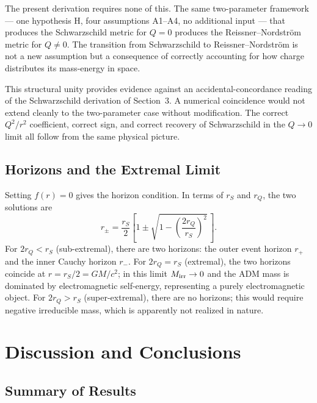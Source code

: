 \documentclass[12pt]{article}
\begin{document}
The present derivation requires none of this.
The same two-parameter framework --- one hypothesis H, four assumptions
A1--A4, no additional input --- that produces the Schwarzschild metric
for $Q = 0$ produces the Reissner--Nordstr\"om metric for $Q \neq 0$.
The transition from Schwarzschild to Reissner--Nordstr\"om is not a
new assumption but a consequence of correctly accounting for how charge
distributes its mass-energy in space.

This structural unity provides evidence against an accidental-concordance
reading of the Schwarzschild derivation of Section~3.
A numerical coincidence would not extend cleanly to the two-parameter
case without modification.
The correct $Q^2/r^2$ coefficient, correct sign, and correct recovery
of Schwarzschild in the $Q \to 0$ limit all follow from the same
physical picture.

\subsection{Horizons and the Extremal Limit}
\label{sec:rn-horizons}

Setting $f(r) = 0$ gives the horizon condition.
In terms of $r_S$ and $r_Q$, the two solutions are
\begin{equation}
  r_\pm = \frac{r_S}{2}\!\left[1 \pm
          \sqrt{1 - \left(\frac{2r_Q}{r_S}\right)^{\!2}}\,\right].
  \label{eq:rn-horizons}
\end{equation}
For $2r_Q < r_S$ (sub-extremal), there are two horizons: the outer
event horizon $r_+$ and the inner Cauchy horizon $r_-$.
For $2r_Q = r_S$ (extremal), the two horizons coincide at
$r = r_S/2 = GM/c^2$; in this limit $M_{\rm irr} \to 0$ and the ADM
mass is dominated by electromagnetic self-energy, representing a
purely electromagnetic object.
For $2r_Q > r_S$ (super-extremal), there are no horizons; this would
require negative irreducible mass, which is apparently not realized
in nature.

\section{Discussion and Conclusions}

\subsection{Summary of Results}
\end{document}
